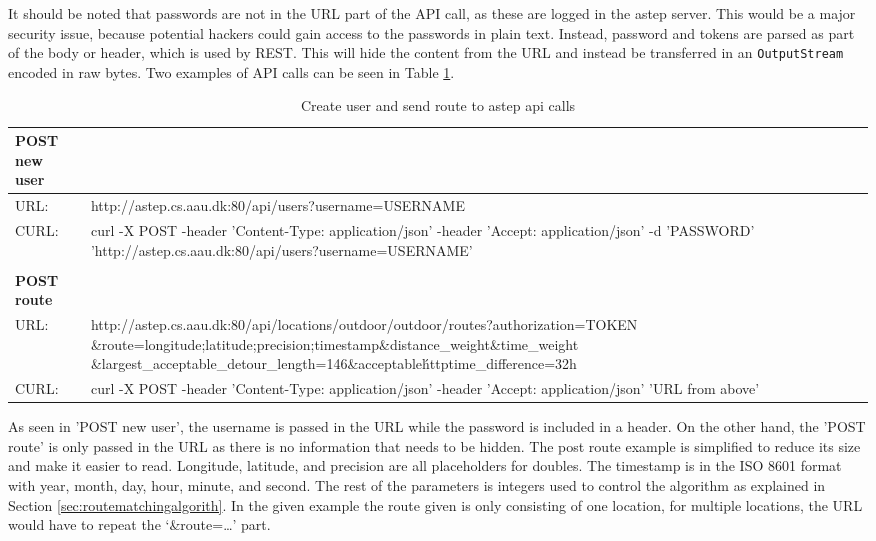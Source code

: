 It should be noted that passwords are not in the URL part of the API call, as these are logged in the \gls{astep} server. 
This would be a major security issue, because potential hackers could gain access to the passwords in plain text.
Instead, password and tokens are parsed as part of the body or header, which is used by REST. 
This will hide the content from the URL and instead be transferred in an \texttt{OutputStream} encoded in raw bytes. 
Two examples of API calls can be seen in Table \ref{tab:apitable}.

\begin{table}[h]
	\scriptsize
	\centering
	\begin{tabularx}{\textwidth}{l X}
		\textbf{POST new user} &  \\\toprule
		URL:          & http://astep.cs.aau.dk:80/api/users?username=USERNAME  \\
		\rowcolor{blue!10}
		CURL:         & curl -X POST -\-header 'Content-Type: application/json' -\-header 'Accept: application/json' -d 'PASSWORD' 'http://astep.cs.aau.dk:80/api/users?username=USERNAME' \\\\
		\textbf{POST route} & \\\toprule
		URL:          & http://astep.cs.aau.dk:80/api/locations/outdoor/outdoor/routes?authorization=TOKEN
						\&route=longitude;latitude;precision;timestamp\&distance\_weight\&time\_weight
						\&largest\_acceptable\_detour\_length=146\&acceptable\'httptime\_difference=32h\\ 
		\rowcolor{blue!10}
		CURL:         & curl -X POST -\-header 'Content-Type: application/json' -\-header 'Accept: application/json' 'URL from above' \\
	\end{tabularx}
	\caption{Create user and send route to \gls{astep} api calls}
	\label{tab:apitable}
\end{table}


As seen in 'POST new user', the username is passed in the URL while the password is included in a header.
On the other hand, the 'POST route' is only passed in the URL as there is no information that needs to be hidden.
The post route example is simplified to reduce its size and make it easier to read.
Longitude, latitude, and precision are all placeholders for doubles.
The timestamp is in the ISO 8601 format with year, month, day, hour, minute, and second.  
The rest of the parameters is integers used to control the algorithm as explained in Section \ref{sec:routematchingalgorith}. 
In the given example the route given is only consisting of one location, for multiple locations, the URL would have to repeat the \enquote*{\&route=\dots} part.

